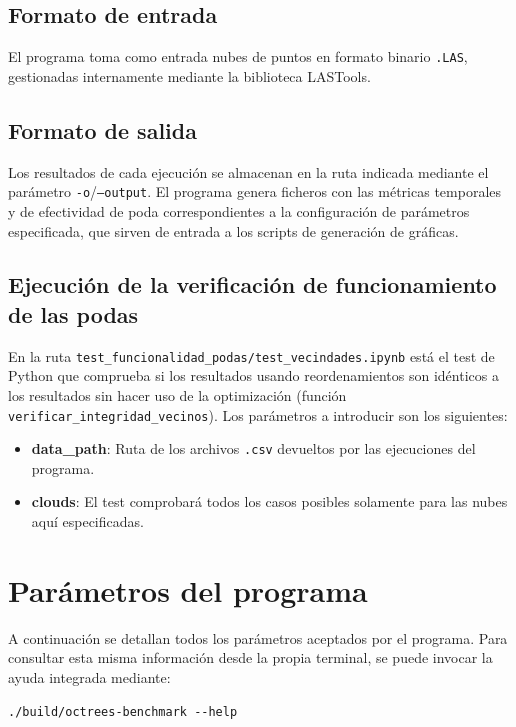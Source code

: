 \subsection{Formato de entrada}

El programa toma como entrada nubes de puntos en formato binario
\texttt{.LAS}, gestionadas internamente mediante la biblioteca LASTools.

\subsection{Formato de salida}

Los resultados de cada ejecución se almacenan en la ruta indicada mediante el parámetro \texttt{-o}/\texttt{--output}. El programa genera ficheros con las métricas temporales y de efectividad de poda correspondientes a la
configuración de parámetros especificada, que sirven de entrada a los scripts de generación de gráficas.

\subsection{Ejecución de la verificación de funcionamiento de las podas}
En la ruta \texttt{test\_funcionalidad\_podas/test\_vecindades.ipynb} está el test de Python que comprueba si los resultados usando reordenamientos son idénticos a los resultados sin hacer uso de la optimización (función \texttt{verificar\_integridad\_vecinos}). Los parámetros a introducir son los siguientes:
\begin{itemize}
    \item \textbf{data\_path}: Ruta de los archivos \texttt{.csv} devueltos por las ejecuciones del programa.
    \item \textbf{clouds}: El test comprobará todos los casos posibles solamente para las nubes aquí especificadas.
\end{itemize}

\section{Parámetros del programa} 

A continuación se detallan todos los parámetros aceptados por el programa. Para consultar esta misma información desde la propia terminal, se puede invocar la ayuda integrada mediante:

\begin{verbatim}
./build/octrees-benchmark --help
\end{verbatim}

